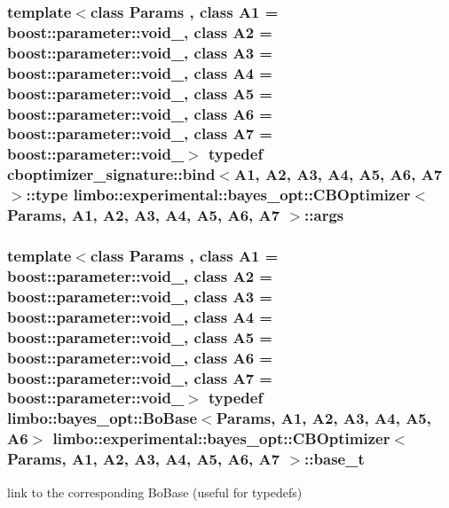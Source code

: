 \subsubsection[{args}]{\setlength{\rightskip}{0pt plus 5cm}template$<$class Params , class A1  = boost\+::parameter\+::void\+\_\+, class A2  = boost\+::parameter\+::void\+\_\+, class A3  = boost\+::parameter\+::void\+\_\+, class A4  = boost\+::parameter\+::void\+\_\+, class A5  = boost\+::parameter\+::void\+\_\+, class A6  = boost\+::parameter\+::void\+\_\+, class A7  = boost\+::parameter\+::void\+\_\+$>$ typedef cboptimizer\+\_\+signature\+::bind$<$A1, A2, A3, A4, A5, A6, A7$>$\+::type {\bf limbo\+::experimental\+::bayes\+\_\+opt\+::\+C\+B\+Optimizer}$<$ Params, A1, A2, A3, A4, A5, A6, A7 $>$\+::{\bf args}}\label{classlimbo_1_1experimental_1_1bayes__opt_1_1_c_b_optimizer_a63a9a28cc266539b492774e381d06d6f}
\hypertarget{classlimbo_1_1experimental_1_1bayes__opt_1_1_c_b_optimizer_a52bd94f4487175ef317b4d35149ac3c9}{}
\subsubsection[{base\+\_\+t}]{\setlength{\rightskip}{0pt plus 5cm}template$<$class Params , class A1  = boost\+::parameter\+::void\+\_\+, class A2  = boost\+::parameter\+::void\+\_\+, class A3  = boost\+::parameter\+::void\+\_\+, class A4  = boost\+::parameter\+::void\+\_\+, class A5  = boost\+::parameter\+::void\+\_\+, class A6  = boost\+::parameter\+::void\+\_\+, class A7  = boost\+::parameter\+::void\+\_\+$>$ typedef {\bf limbo\+::bayes\+\_\+opt\+::\+Bo\+Base}$<$Params, A1, A2, A3, A4, A5, A6$>$ {\bf limbo\+::experimental\+::bayes\+\_\+opt\+::\+C\+B\+Optimizer}$<$ Params, A1, A2, A3, A4, A5, A6, A7 $>$\+::{\bf base\+\_\+t}}\label{classlimbo_1_1experimental_1_1bayes__opt_1_1_c_b_optimizer_a52bd94f4487175ef317b4d35149ac3c9}


link to the corresponding Bo\+Base (useful for typedefs) 

\hypertarget{classlimbo_1_1experimental_1_1bayes__opt_1_1_c_b_optimizer_a1f820a8eb0aebd5eb8ff359b35b98bdc}{}
